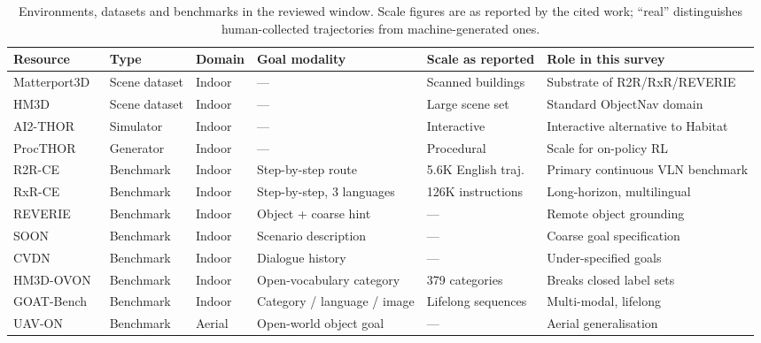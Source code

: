 \documentclass[journal]{IEEEtran}
\begin{document}
\begin{table}[!t]
  \caption{Environments, datasets and benchmarks in the reviewed window.
  Scale figures are as reported by the cited work; ``real'' distinguishes
  human-collected trajectories from machine-generated ones.}
  \label{tab:datasets}
  \centering
  \setlength{\tabcolsep}{3pt}
  \footnotesize
  \begin{tabular}{llllll}
    \toprule
    Resource & Type & Domain & Goal modality & Scale as reported & Role in this survey \\
    \midrule
    Matterport3D~\cite{chang2017matterport3d} & Scene dataset & Indoor & --- & Scanned buildings & Substrate of R2R/RxR/REVERIE \\
    HM3D~\cite{ramakrishnan2021habitat}       & Scene dataset & Indoor & --- & Large scene set & Standard ObjectNav domain \\
    AI2-THOR~\cite{kolve2017ai2}              & Simulator     & Indoor & --- & Interactive & Interactive alternative to Habitat \\
    ProcTHOR~\cite{deitke2022procthor}        & Generator     & Indoor & --- & Procedural & Scale for on-policy RL~\cite{zeng2024poliformer} \\
    \midrule
    R2R-CE~\cite{krantz2020beyond}            & Benchmark & Indoor & Step-by-step route & 5.6K English traj.~\cite{wei2025streamvln} & Primary continuous VLN benchmark \\
    RxR-CE~\cite{ku2020room}                  & Benchmark & Indoor & Step-by-step, 3 languages & 126K instructions~\cite{wei2025streamvln} & Long-horizon, multilingual \\
    REVERIE~\cite{qi2020reverie}              & Benchmark & Indoor & Object + coarse hint & --- & Remote object grounding \\
    SOON~\cite{zhu2021soon}                   & Benchmark & Indoor & Scenario description & --- & Coarse goal specification \\
    CVDN~\cite{thomason2019vision}            & Benchmark & Indoor & Dialogue history & --- & Under-specified goals \\
    \midrule
    HM3D-OVON~\cite{yokoyama2024ovon}         & Benchmark & Indoor & Open-vocabulary category & 379 categories & Breaks closed label sets \\
    GOAT-Bench~\cite{khanna2024goat}          & Benchmark & Indoor & Category / language / image & Lifelong sequences & Multi-modal, lifelong \\
    UAV-ON~\cite{xiao2025benchmark}           & Benchmark & Aerial & Open-world object goal & --- & Aerial generalisation \\

\end{tabular}
\end{table}
\end{document}
